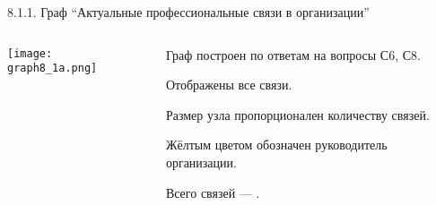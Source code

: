 \begin{frame}{8.1.1. Граф ``Актуальные профессиональные связи в организации''}

\begin{columns} 
\begin{column}{0.75\textwidth} 
\centering
          \texttt{[image: graph8\_1a.png]}
\end{column}
\begin{column}{0.25\textwidth} 

\tiny
Граф построен по ответам на вопросы С6, С8.
\smallskip

Отображены все связи. 
\smallskip

Размер узла пропорционален количеству связей.
\smallskip

Жёлтым цветом обозначен руководитель организации.
\bigskip

Всего связей --- \valHAAlinks.

\end{column}
\end{columns}
\end{frame}


